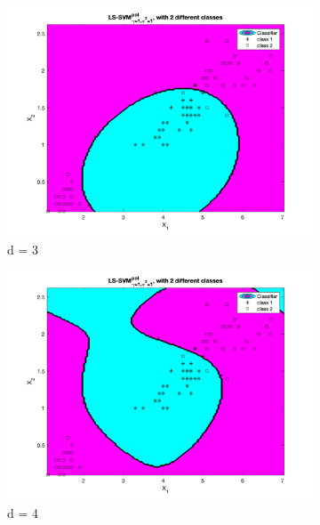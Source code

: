 \documentclass[a4paper, 11pt, one column]{article}
\begin{document}
\begin{figure}[]
		\begin{subfigure}{0.33\linewidth}
            \includegraphics[width=\linewidth]{images/ls_svm._poly_deg3.png}
            \caption{d = 3}
        \end{subfigure}
        \begin{subfigure}{0.33\linewidth}
            \includegraphics[width=\linewidth]{images/ls_svm_poly_deg4.png}
            \caption{d = 4}
        \end{subfigure}
        \begin{subfigure}{0.33\linewidth}

\end{subfigure}
\end{figure}
\end{document}
